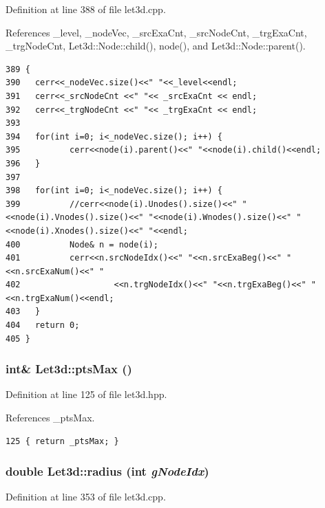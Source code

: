 Definition at line 388 of file let3d.cpp.

References \_\-level, \_\-node\-Vec, \_\-src\-Exa\-Cnt, \_\-src\-Node\-Cnt, \_\-trg\-Exa\-Cnt, \_\-trg\-Node\-Cnt, Let3d::Node::child(), node(), and Let3d::Node::parent().

\footnotesize\begin{verbatim}389 {
390   cerr<<_nodeVec.size()<<" "<<_level<<endl;
391   cerr<<_srcNodeCnt <<" "<< _srcExaCnt << endl;
392   cerr<<_trgNodeCnt <<" "<< _trgExaCnt << endl;
393 
394   for(int i=0; i<_nodeVec.size(); i++) {
395          cerr<<node(i).parent()<<" "<<node(i).child()<<endl;
396   }
397   
398   for(int i=0; i<_nodeVec.size(); i++) {
399          //cerr<<node(i).Unodes().size()<<" "<<node(i).Vnodes().size()<<" "<<node(i).Wnodes().size()<<" "<<node(i).Xnodes().size()<<" "<<endl;
400          Node& n = node(i);
401          cerr<<n.srcNodeIdx()<<" "<<n.srcExaBeg()<<" "<<n.srcExaNum()<<" "
402                   <<n.trgNodeIdx()<<" "<<n.trgExaBeg()<<" "<<n.trgExaNum()<<endl;
403   }
404   return 0;
405 }
\end{verbatim}\normalsize 


\subsubsection{\setlength{\rightskip}{0pt plus 5cm}int\& Let3d::pts\-Max ()\hspace{0.3cm}{\tt  [inline]}}\label{classLet3d_682c29880d87862bd529f951970bf83a_682c29880d87862bd529f951970bf83a}




Definition at line 125 of file let3d.hpp.

References \_\-pts\-Max.

\footnotesize\begin{verbatim}125 { return _ptsMax; }
\end{verbatim}\normalsize 


\subsubsection{\setlength{\rightskip}{0pt plus 5cm}double Let3d::radius (int {\em g\-Node\-Idx})}\label{classLet3d_c1534d5f7ba6030886668befb2b472c0_c1534d5f7ba6030886668befb2b472c0}




Definition at line 353 of file let3d.cpp.

